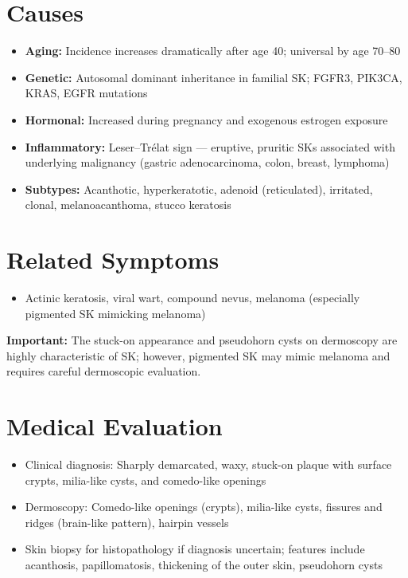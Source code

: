 \section*{Causes}
\begin{itemize}
  \item \textbf{Aging:} Incidence increases dramatically after age 40; universal by age 70--80
  \item \textbf{Genetic:} Autosomal dominant inheritance in familial SK; FGFR3, PIK3CA, KRAS, EGFR mutations
  \item \textbf{Hormonal:} Increased during pregnancy and exogenous estrogen exposure
  \item \textbf{Inflammatory:} Leser--Tr\'elat sign --- eruptive, pruritic SKs associated with underlying malignancy (gastric adenocarcinoma, colon, breast, lymphoma)
  \item \textbf{Subtypes:} Acanthotic, hyperkeratotic, adenoid (reticulated), irritated, clonal, melanoacanthoma, stucco keratosis
\end{itemize}

\section*{Related Symptoms}
\begin{itemize}
  \item Actinic keratosis, viral wart, compound nevus, melanoma (especially pigmented SK mimicking melanoma)
\end{itemize}
\textbf{Important:} The stuck-on appearance and pseudohorn cysts on dermoscopy are highly characteristic of SK; however, pigmented SK may mimic melanoma and requires careful dermoscopic evaluation.

\section*{Medical Evaluation}
\begin{itemize}
  \item Clinical diagnosis: Sharply demarcated, waxy, stuck-on plaque with surface crypts, milia-like cysts, and comedo-like openings
  \item Dermoscopy: Comedo-like openings (crypts), milia-like cysts, fissures and ridges (brain-like pattern), hairpin vessels
  \item Skin biopsy for histopathology if diagnosis uncertain; features include acanthosis, papillomatosis, thickening of the outer skin, pseudohorn cysts
\end{itemize}

